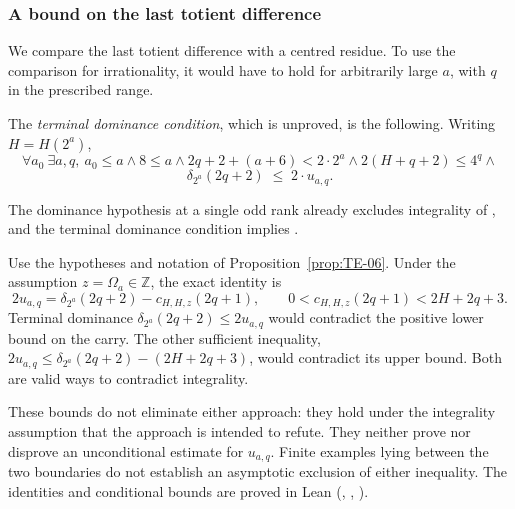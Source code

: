 \subsubsection{A bound on the last totient difference}

We compare the last totient difference with a centred residue. To use
the comparison for irrationality, it would have to hold for arbitrarily
large $a$, with $q$ in the prescribed range.

\begin{defn}
The \emph{terminal dominance condition}, which is unproved, is the
following. Writing $H={H}(2^a)$,
\[
  \forall a_0\ \exists a,q,\ a_0\le a \wedge 8\le a \wedge 2q{+}2{+}(a{+}6)<2\cdot 2^a \wedge
  2(H{+}q{+}2)\le 4^q \wedge
\]
\[
  \delta_{2^a}(2q{+}2) \;\le\; 2\cdot u_{a,q} .
\]
\end{defn}

\begin{thm}\label{thm:proved-implication}
The dominance hypothesis at a single odd rank already excludes
integrality of , and the terminal dominance condition implies
.
\end{thm}

\begin{obs}\label{obs:staircase-tension}
Use the hypotheses and notation of Proposition~\ref{prop:TE-06}. Under
the assumption $z=\Omega_a\in\mathbb Z$, the exact identity is
\[
 2u_{a,q}=\delta_{2^a}(2q+2)-c_{H,H,z}(2q+1),
 \qquad 0<c_{H,H,z}(2q+1)<2H+2q+3.
\]
Terminal dominance $\delta_{2^a}(2q+2)\le2u_{a,q}$ would contradict the
positive lower bound on the carry. The other sufficient inequality,
$2u_{a,q}\le\delta_{2^a}(2q+2)-(2H+2q+3)$, would contradict its upper
bound. Both are valid ways to contradict integrality.

These bounds do not eliminate either approach: they hold under the
integrality assumption that the approach is intended to refute. They
neither prove nor disprove an unconditional estimate for $u_{a,q}$.
Finite examples lying between the two boundaries do not establish an
asymptotic exclusion of either inequality. The identities and
conditional bounds are proved in Lean
(,
,
).
\end{obs}

